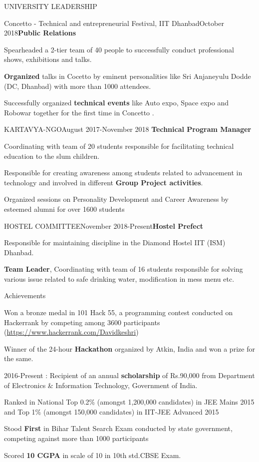\documentclass{resume} %
\begin{document}
\begin{rSection}{UNIVERSITY LEADERSHIP}
\begin{rSubsection}{Concetto - Technical and entrepreneurial Festival, IIT Dhanbad}{October 2018}{\textbf{Public Relations}}{}
\item Spearheaded a 2-tier team of 40 people to successfully conduct professional shows, exhibitions and talks.
\item \textbf{Organized} talks in Cocetto by eminent personalities like Sri Anjaneyulu Dodde (DC, Dhanbad) with more than 1000 attendees.
\item Successfully organized \textbf{technical events} like Auto expo, Space expo and Robowar together for the first time in Concetto .
\end{rSubsection}
\begin{rSubsection}{KARTAVYA-NGO}{August 2017-November 2018}{\textbf{ Technical Program Manager }}{}
\item Coordinating with team of 20 students responsible for facilitating technical education to the slum children. 
\item Responsible for creating awareness among students related to advancement in technology and involved in different \textbf{Group Project activities}. 
\item Organized sessions on Personality Development and Career Awareness by esteemed alumni for over 1600 students
\end{rSubsection}
\begin{rSubsection}{HOSTEL COMMITTEE}{November 2018-Present}{\textbf{Hostel Prefect}}{}
\item Responsible for maintaining discipline in the Diamond Hostel IIT (ISM) Dhanbad.
\item \textbf{Team Leader}, Coordinating with team of 16 students responsible for solving various issue related to safe drinking water, modification in mess menu etc.
\end{rSubsection}
\end{rSection}
\begin{rSection}{Achievements} \itemsep -2pt
\item  Won a bronze medal in 101 Hack 55, a programming contest conducted on Hackerrank by competing among 3600 participants (\url{https://www.hackerrank.com/Davidkeshri})
\item  Winner of the 24-hour \textbf{Hackathon} organized by Atkin, India and won a prize for the same.\item 2016-Present : Recipient of an annual \textbf{scholarship} of Rs.90,000 from Department of Electronics \& Information Technology, Government of India.
\item Ranked in National Top 0.2\% (amongst 1,200,000 candidates) in JEE Mains 2015 and Top 1\% (amongst 150,000 candidates) in IIT-JEE Advanced 2015 
\item Stood \textbf{First} in Bihar Talent Search Exam conducted by state government, competing against more than 1000 participants
\item Scored \textbf{10 CGPA} in scale of 10 in 10th std.CBSE Exam. 
\end{rSection}
\end{document}
